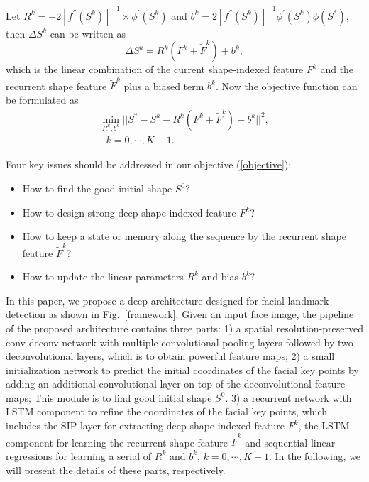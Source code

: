 \documentclass[journal]{IEEEtran}
\begin{document}
Let $R^k = -2[f^{''}(S^k)]^{-1} \times \phi^{'}(S^k) $ and $b^k = 2[f^{''}(S^k)]^{-1} \phi^{'}(S^k) \phi(S^{*})$, then $\Delta S^k$ can be written as
\begin{equation}
\Delta S^k = R^k(F^k + \widetilde{F}^{k}) + b^k,
\label{update_rule}
\end{equation}
which is the linear combination of the current shape-indexed feature $F^k$ and the recurrent shape feature $\widetilde{F}^{k}$ plus a biased term $b^k$. Now the objective function can be formulated as
 \begin{equation}
 \begin{aligned}
 & \min_{R^k,b^k} ||S^* - S^k - R^k(F^k +\widetilde{F}^{k}) - b^k ||^2,& \\
 & \ \ \ k=0,\cdots,K-1.&
  \end{aligned}
  \label{objective}
 \end{equation}

Four key issues should be addressed in our objective (\ref{objective}):
\begin{itemize}
\item How to find the good initial shape $S^0$?
\item How to design strong deep shape-indexed feature $F^k$?
\item How to keep a state or memory along the sequence by the recurrent shape feature $\widetilde{F}^{k}$?
\item How to update the linear parameters $R^k$ and bias $b^k$?
\end{itemize}

In this paper, we propose a deep architecture designed for facial landmark detection as shown in Fig.~\ref{framework}. Given an input face image, the pipeline of the proposed architecture contains three parts: 1) a spatial resolution-preserved conv-deconv network with multiple convolutional-pooling layers followed by two deconvolutional layers, which is to obtain powerful feature maps; 2) a small initialization network to predict the initial coordinates of the facial key points by adding an additional convolutional layer on top of the deconvolutional feature maps; This module is to find good initial shape $S^0$. 3) a recurrent network with LSTM component to refine the coordinates of the facial key points, which includes the SIP layer for extracting deep shape-indexed feature $F^k$, the LSTM component for learning the recurrent shape feature $\widetilde{F}^{k}$ and sequential linear regressions for learning a serial of $R^k$ and $b^k$, $k=0,\cdots,K-1$. In the following, we will present the details of these parts, respectively.
\end{document}
